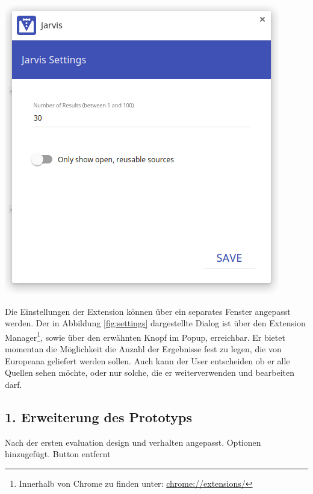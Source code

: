  \begin{minipage}{\linewidth}
	\centering
	\vspace*{0.5cm}
	\includegraphics[scale=0.5]{Bilder/app-screenshots/settings.png}
	\label{fig:settings}
	\vspace*{0.5cm}
 \end{minipage}

 Die Einstellungen der Extension können über ein separates Fenster angepasst werden. Der in Abbildung \ref{fig:settings} dargestellte Dialog ist über den Extension Manager\footnote{Innerhalb von Chrome zu finden unter: \url{chrome://extensions/}}, sowie über den erwähnten Knopf im Popup, erreichbar. Er bietet momentan die Möglichkeit die Anzahl der Ergebnisse fest zu legen, die von Europeana geliefert werden sollen. Auch kann der User entscheiden ob er alle Quellen sehen möchte, oder nur solche, die er weiterverwenden und bearbeiten darf.


 \subsection{1. Erweiterung des Prototyps}
 Nach der ersten evaluation design und verhalten angepasst. Optionen hinzugefügt. Button entfernt

